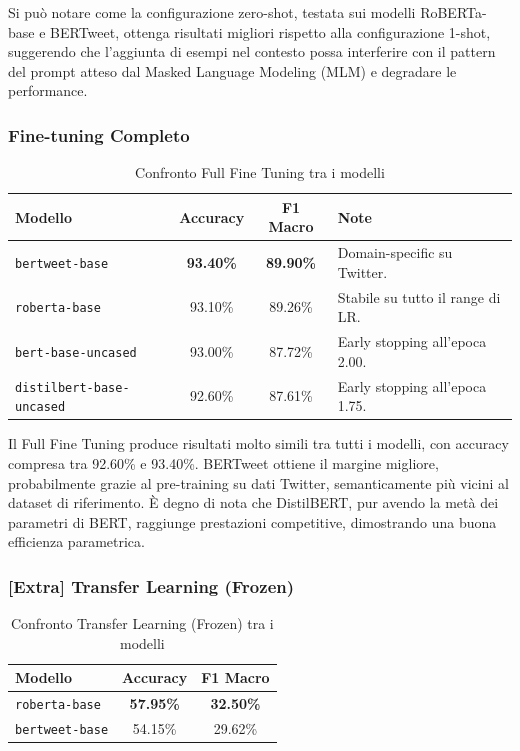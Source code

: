 \documentclass[a4paper,12pt]{article}
\begin{document}
Si può notare come la configurazione zero-shot, testata sui modelli RoBERTa-base e BERTweet, ottenga risultati migliori rispetto alla configurazione 1-shot, suggerendo che l'aggiunta di esempi nel contesto possa interferire con il pattern del prompt atteso dal Masked Language Modeling (MLM) e degradare le performance.

\subsubsection{Fine-tuning Completo}

\begin{table}[H]
    \centering
    \renewcommand{\arraystretch}{1.3}
    \begin{tabular}{|l|c|c|l|}
        \hline
        \textbf{Modello}                 & \textbf{Accuracy} & \textbf{F1 Macro} & \textbf{Note}                    \\
        \hline
        \texttt{bertweet-base}           & \textbf{93.40\%}  & \textbf{89.90\%}  & Domain-specific su Twitter.      \\
        \texttt{roberta-base}            & 93.10\%           & 89.26\%           & Stabile su tutto il range di LR. \\
        \texttt{bert-base-uncased}       & 93.00\%           & 87.72\%           & Early stopping all'epoca 2.00.   \\
        \texttt{distilbert-base-uncased} & 92.60\%           & 87.61\%           & Early stopping all'epoca 1.75.   \\
        \hline
    \end{tabular}
    \caption{Confronto Full Fine Tuning tra i modelli}
\end{table}

Il Full Fine Tuning produce risultati molto simili tra tutti i modelli, con accuracy compresa tra 92.60\% e 93.40\%.
BERTweet ottiene il margine migliore, probabilmente grazie al pre-training su dati Twitter, semanticamente
più vicini al dataset di riferimento. È degno di nota che DistilBERT, pur avendo la metà dei parametri di BERT,
raggiunge prestazioni competitive, dimostrando una buona efficienza parametrica.

\subsubsection{[Extra] Transfer Learning (Frozen)}

\begin{table}[H]
    \centering
    \renewcommand{\arraystretch}{1.3}
    \begin{tabular}{|l|c|c|}
        \hline
        \textbf{Modello}       & \textbf{Accuracy} & \textbf{F1 Macro} \\
        \hline
        \texttt{roberta-base}  & \textbf{57.95\%}  & \textbf{32.50\%}  \\
        \texttt{bertweet-base} & 54.15\%           & 29.62\%           \\
        \hline
    \end{tabular}
    \caption{Confronto Transfer Learning (Frozen) tra i modelli}
\end{table}
\end{document}
